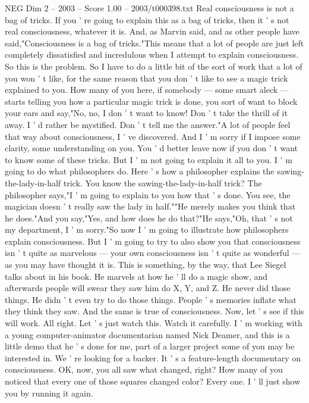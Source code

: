 \begin{textsample}{NEG Dim 2 – 2003 – Score 1.00 – 2003/t000398.txt}
Real consciousness is not a bag of tricks.
If you ' re going to explain this as a bag of tricks, then it ' s not real consciousness, whatever it is.
And, as Marvin said, and as other people have said,"Consciousness is a bag of tricks."This means that a lot of people are just left completely dissatisfied and incredulous when I attempt to explain consciousness.
So this is the problem.
So I have to do a little bit of the sort of work that a lot of you won ' t like, for the same reason that you don ' t like to see a magic trick explained to you.
How many of you here, if somebody — some smart aleck — starts telling you how a particular magic trick is done, you sort of want to block your ears and say,"No, no, I don ' t want to know!
Don ' t take the thrill of it away.
I ' d rather be mystified.
Don ' t tell me the answer."A lot of people feel that way about consciousness, I ' ve discovered.
And I ' m sorry if I impose some clarity, some understanding on you.
You ' d better leave now if you don ' t want to know some of these tricks.
But I ' m not going to explain it all to you.
I ' m going to do what philosophers do.
Here ' s how a philosopher explains the sawing-the-lady-in-half trick.
You know the sawing-the-lady-in-half trick?
The philosopher says,"I ' m going to explain to you how that ' s done.
You see, the magician doesn ' t really saw the lady in half.""He merely makes you think that he does."And you say,"Yes, and how does he do that?"He says,"Oh, that ' s not my department, I ' m sorry."So now I ' m going to illustrate how philosophers explain consciousness.
But I ' m going to try to also show you that consciousness isn ' t quite as marvelous — your own consciousness isn ' t quite as wonderful — as you may have thought it is.
This is something, by the way, that Lee Siegel talks about in his book.
He marvels at how he ' ll do a magic show, and afterwards people will swear they saw him do X, Y, and Z.
He never did those things.
He didn ' t even try to do those things.
People ' s memories inflate what they think they saw.
And the same is true of consciousness.
Now, let ' s see if this will work.
All right.
Let ' s just watch this.
Watch it carefully.
I ' m working with a young computer-animator documentarian named Nick Deamer, and this is a little demo that he ' s done for me, part of a larger project some of you may be interested in.
We ' re looking for a backer.
It ' s a feature-length documentary on consciousness.
OK, now, you all saw what changed, right?
How many of you noticed that every one of those squares changed color?
Every one.
I ' ll just show you by running it again.

\end{textsample}
